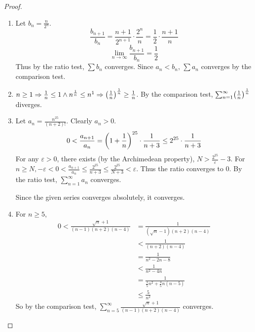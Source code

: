 \documentclass[12pt]{article}
\begin{document}
\begin{proof}
    \begin{enumerate}[label=(\arabic*)]
        \item Let $b_{n} = \frac{n}{2^{n}}$. \[
            \frac{b_{n+1}}{b_{n}} = \frac{n+1}{2^{n+1}} \cdot \frac{2^{n}}{n} = \frac{1}{2} \cdot \frac{n+1}{n}
        \] \[
            \lim_{n \to \infty} \frac{b_{n+1}}{b_{n}} = \frac{1}{2}
        \] Thus by the ratio test, $\sum b_{n}$ converges. Since $a_{n} < b_{n}$, $\sum a_{n}$ converges by the comparison test.

        \item $n \geq 1 \implies \frac{1}{n} \leq 1 \land n^{\frac{1}{n}} \leq  n^{1} \implies \paren{\frac{1}{n}}^{\frac{1}{n}} \geq \frac{1}{n}$.
        By the comparison test, $\sum_{n=1}^{\infty}\paren{\frac{1}{n}}^{\frac{1}{n}}$ diverges.

        \item Let $a_{n} = \frac{n^{25}}{(n + 2)!}$.
        Clearly $a_{n} > 0$. \[
            0 < \frac{a_{n+1}}{a_{n}} = \paren{1 + \frac{1}{n}}^{25} \cdot \frac{1}{n + 3} \leq 2^{25} \cdot \frac{1}{n + 3}
        \] For any $\varepsilon > 0$, there exists (by the Archimedean property), $N > \frac{2^{25}}{\varepsilon} - 3$.
        For $n \geq N, -\varepsilon < 0 < \frac{a_{n+1}}{a_{n}} \leq \frac{2^{25}}{n + 3} \leq \frac{2^{25}}{N + 3} < \varepsilon$.
        Thus the ratio converges to 0.
        By the ratio test, $\sum_{n=1}^{\infty} a_{n}$ converges.

        Since the given series converges absolutely, it converges.

        \item For $n \geq 5$, 
        \begin{align*}
            0 < \frac{\sqrt{n} + 1}{(n - 1)(n + 2)(n - 4)} &= \frac{1}{(\sqrt{n} - 1)(n + 2)(n - 4)} \\
            &< \frac{1}{(n + 2)(n - 4)} \\
            &= \frac{1}{n^{2} - 2n - 8} \\
            &< \frac{1}{n^{2} - 4n} \\
            &= \frac{1}{\frac{1}{5}n^{2} + \frac{4}{5} n (n - 5)} \\
            &\leq \frac{5}{n^{2}}
        \end{align*}
        So by the comparison test, $\sum\limits_{n=5}^{\infty}\frac{\sqrt{n} + 1}{(n - 1)(n + 2)(n - 4)}$ converges. \qedhere
    \end{enumerate}
\end{proof}
\end{document}
